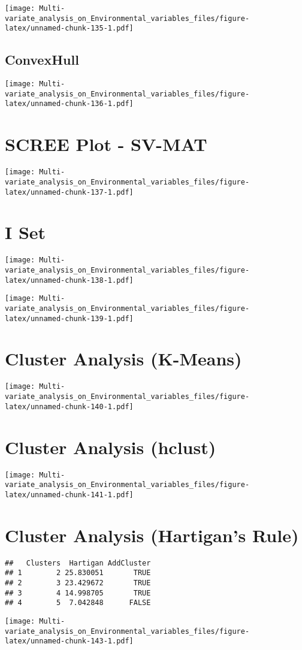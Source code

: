\documentclass[]{book}
\begin{document}
\texttt{[image: Multi-variate\_analysis\_on\_Environmental\_variables\_files/figure-latex/unnamed-chunk-135-1.pdf]}

\hypertarget{convexhull-1}{%
\subsection{ConvexHull}\label{convexhull-1}}

\texttt{[image: Multi-variate\_analysis\_on\_Environmental\_variables\_files/figure-latex/unnamed-chunk-136-1.pdf]}

\hypertarget{scree-plot---sv-mat-1}{%
\section{SCREE Plot - SV-MAT}\label{scree-plot---sv-mat-1}}

\texttt{[image: Multi-variate\_analysis\_on\_Environmental\_variables\_files/figure-latex/unnamed-chunk-137-1.pdf]}

\hypertarget{i-set-1}{%
\section{I Set}\label{i-set-1}}

\texttt{[image: Multi-variate\_analysis\_on\_Environmental\_variables\_files/figure-latex/unnamed-chunk-138-1.pdf]}

\texttt{[image: Multi-variate\_analysis\_on\_Environmental\_variables\_files/figure-latex/unnamed-chunk-139-1.pdf]}

\hypertarget{cluster-analysis-k-means-1}{%
\section{Cluster Analysis (K-Means)}\label{cluster-analysis-k-means-1}}

\texttt{[image: Multi-variate\_analysis\_on\_Environmental\_variables\_files/figure-latex/unnamed-chunk-140-1.pdf]}

\hypertarget{cluster-analysis-hclust-1}{%
\section{Cluster Analysis (hclust)}\label{cluster-analysis-hclust-1}}

\texttt{[image: Multi-variate\_analysis\_on\_Environmental\_variables\_files/figure-latex/unnamed-chunk-141-1.pdf]}

\hypertarget{cluster-analysis-hartigans-rule-1}{%
\section{Cluster Analysis (Hartigan's
Rule)}\label{cluster-analysis-hartigans-rule-1}}

\begin{verbatim}
##   Clusters  Hartigan AddCluster
## 1        2 25.830051       TRUE
## 2        3 23.429672       TRUE
## 3        4 14.998705       TRUE
## 4        5  7.042848      FALSE
\end{verbatim}

\texttt{[image: Multi-variate\_analysis\_on\_Environmental\_variables\_files/figure-latex/unnamed-chunk-143-1.pdf]}


\end{document}
